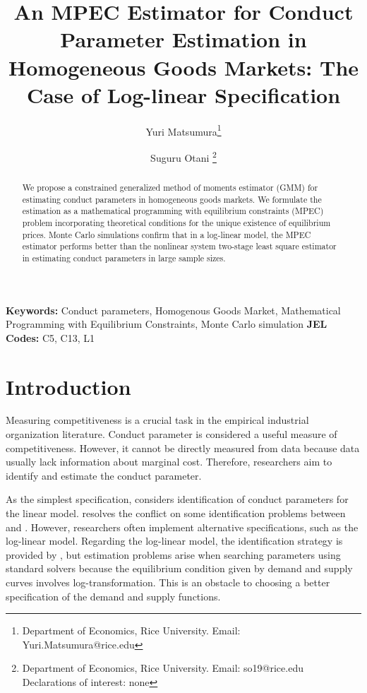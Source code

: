 \documentclass[11pt, a4paper]{article}
\title{An MPEC Estimator for Conduct Parameter Estimation in Homogeneous Goods Markets: The Case of Log-linear Specification}
\author{Yuri Matsumura\thanks{Department of Economics, Rice University. Email: Yuri.Matsumura@rice.edu} \and Suguru Otani \thanks{Department of Economics, Rice University. Email: so19@rice.edu
\\Declarations of interest: none %
}}
\begin{document}
\maketitle
\begin{abstract}
    We propose a constrained generalized method of moments estimator (GMM) for estimating conduct parameters in homogeneous goods markets. We formulate the estimation as a mathematical programming with equilibrium constraints (MPEC) problem incorporating theoretical conditions for the unique existence of equilibrium prices. 
    Monte Carlo simulations confirm that in a log-linear model, the MPEC estimator performs better than the nonlinear system two-stage least square estimator in estimating conduct parameters in large sample sizes. %
\end{abstract}

\noindent\textbf{Keywords:} Conduct parameters, Homogenous Goods Market, Mathematical Programming with Equilibrium Constraints, Monte Carlo simulation
\vspace{0in}
\newline
\noindent\textbf{JEL Codes:} C5, C13, L1

\bigskip

\section{Introduction}
Measuring competitiveness is a crucial task in the empirical industrial organization literature.
Conduct parameter is considered a useful measure of competitiveness. 
However, it cannot be directly measured from data because data usually lack information about marginal cost.
Therefore, researchers aim to identify and estimate the conduct parameter.

As the simplest specification, \citet{bresnahan1982oligopoly} considers identification of conduct parameters for the linear model. \cite{matsumura2023resolving} resolves the conflict on some identification problems between \cite{bresnahan1982oligopoly} and \cite{perloff2012collinearity}. 
However, researchers often implement alternative specifications, such as the log-linear model\citep{okazaki2022excess,merel2009measuring}. 
Regarding the log-linear model, the identification strategy is provided by \citet{lau1982identifying}, but  
estimation problems arise when searching parameters using standard solvers because the equilibrium condition given by demand and supply curves involves log-transformation. 
This is an obstacle to choosing a better specification of the demand and supply functions.
\end{document}
